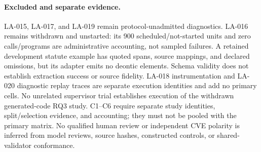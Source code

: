 \paragraph{Excluded and separate evidence.}
LA-015, LA-017, and LA-019 remain protocol-unadmitted diagnostics.
LA-016 remains withdrawn and unstarted: its 900 scheduled/not-started units
and zero calls/programs are administrative accounting, not sampled failures.
A retained development statute example has quoted spans, source mappings,
and declared omissions, but its adapter emits no deontic elements. Schema
validity does not establish extraction success or source fidelity.
LA-018 instrumentation and LA-020 diagnostic replay traces are separate
execution identities and add no primary cells. No unrelated supervisor
trial establishes execution of the withdrawn generated-code RQ3 study.
C1--C6 require separate study identities, split/selection evidence, and
accounting; they must not be pooled with the primary matrix. No qualified
human review or independent CVE polarity is inferred from model reviews,
source hashes, constructed controls, or shared-validator conformance.
